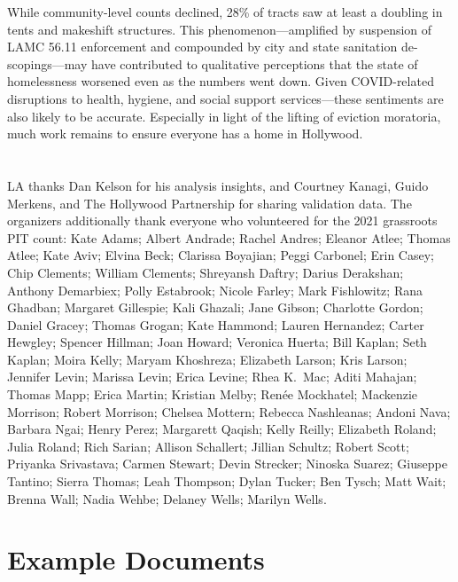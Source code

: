 \documentclass[11pt,twocolumn]{article}
\def\Count{count}
\begin{document}
While community-level counts declined, 28\% of tracts saw at least a doubling in tents and 
makeshift structures. This phenomenon---amplified by suspension of LAMC 56.11 enforcement
and compounded by city and state sanitation de-scopings---may have contributed to qualitative 
perceptions that the state of homelessness worsened even as the numbers went down. Given 
COVID-related disruptions to health, hygiene, and social support services---these sentiments are also 
likely to be accurate. Especially in light of the lifting of eviction moratoria, much work remains to 
ensure everyone has a home in Hollywood.

\section*{}

LA thanks Dan Kelson for his analysis insights, and Courtney Kanagi, Guido Merkens, 
and The Hollywood Partnership for sharing validation data. The organizers additionally thank 
everyone who volunteered for the 2021 grassroots PIT \Count: Kate Adams;
Albert Andrade;
Rachel Andres;
Eleanor Atlee;
Thomas Atlee; 
Kate Aviv;
Elvina Beck; 
Clarissa Boyajian;
Peggi Carbonel;
Erin Casey;
Chip Clements;
William Clements;
Shreyansh Daftry;
Darius Derakshan;
Anthony Demarbiex;
Polly Estabrook;
Nicole Farley;
Mark Fishlowitz; 
Rana Ghadban;
Margaret Gillespie; 
Kali Ghazali;
Jane Gibson;
Charlotte Gordon;
Daniel Gracey;
Thomas Grogan;
Kate Hammond;
Lauren Hernandez;
Carter Hewgley;
Spencer Hillman;
Joan Howard;
Veronica Huerta;
Bill Kaplan;
Seth Kaplan;
Moira Kelly; 
Maryam Khoshreza;
Elizabeth Larson;
Kris Larson;
Jennifer Levin;
Marissa Levin;
Erica Levine;
Rhea K.~Mac;
Aditi Mahajan;
Thomas Mapp;
Erica Martin;
Kristian Melby;
Ren\'{e}e Mockhatel;
Mackenzie Morrison;
Robert Morrison;
Chelsea Mottern;
Rebecca Nashleanas;
Andoni Nava;
Barbara Ngai;
Henry Perez;
Margarett Qaqish;
Kelly Reilly;
Elizabeth Roland;
Julia Roland;
Rich Sarian;
Allison Schallert; 
Jillian Schultz;
Robert Scott;
Priyanka Srivastava;
Carmen Stewart;
Devin Strecker; 
Ninoska Suarez;
Giuseppe Tantino;
Sierra Thomas; 
Leah Thompson; 
Dylan Tucker;
Ben Tysch; 
Matt Wait;
Brenna Wall;
Nadia Wehbe;
Delaney Wells;
Marilyn Wells.

\appendix

\section{Example Documents}
\end{document}

